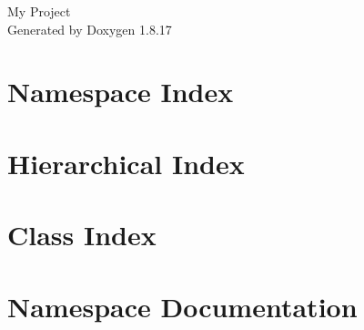 \let\mypdfximage\pdfximage\def\pdfximage{\immediate\mypdfximage}\documentclass[twoside]{book}
\newcommand{\+}{\discretionary{\mbox{\scriptsize$\hookleftarrow$}}{}{}}
\newcommand{\clearemptydoublepage}{%
  \newpage{\pagestyle{empty}\cleardoublepage}%
}
\begin{document}
\hypersetup{pageanchor=false,
             bookmarksnumbered=true,
             pdfencoding=unicode
            }
\begin{titlepage}
\vspace*{7cm}
\begin{center}%
{\Large My Project }\\
\vspace*{1cm}
{\large Generated by Doxygen 1.8.17}\\
\end{center}
\end{titlepage}
\clearemptydoublepage
{}
\tableofcontents
\clearemptydoublepage
{}
\hypersetup{pageanchor=true}

\chapter{Namespace Index}

\chapter{Hierarchical Index}

\chapter{Class Index}

\chapter{Namespace Documentation}


\end{document}
